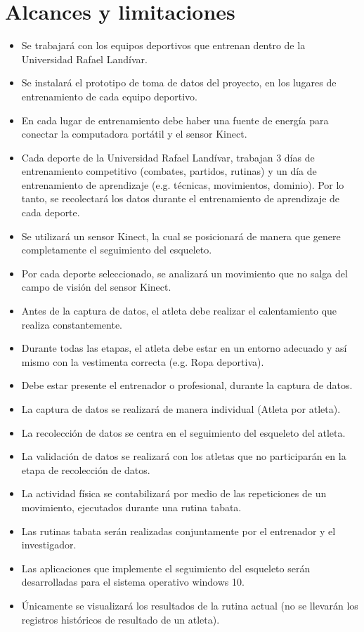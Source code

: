 \section{Alcances y limitaciones}
\begin{itemize}
\item Se trabajar\'a con los equipos deportivos que entrenan dentro de la Universidad Rafael Land\'ivar.
\item Se instalar\'a el prototipo de toma de datos del proyecto, en los lugares de entrenamiento de cada equipo deportivo.
\item En cada lugar de entrenamiento debe haber una fuente de energ\'ia para conectar la computadora port\'atil y el sensor Kinect.
\item Cada deporte de la Universidad Rafael Land\'ivar, trabajan  3 d\'ias de entrenamiento competitivo (combates, partidos, rutinas) y un d\'ia de entrenamiento de aprendizaje (e.g. t\'ecnicas, movimientos, dominio). Por lo tanto, se recolectar\'a los datos durante el entrenamiento de aprendizaje de cada deporte.
\item Se utilizar\'a un sensor Kinect, la cual se posicionar\'a de manera que genere completamente el seguimiento del esqueleto.
\item Por cada deporte seleccionado, se analizar\'a un movimiento que no salga del campo de visi\'on del sensor Kinect.
\item Antes de la captura de datos, el atleta debe realizar el calentamiento que realiza constantemente.
\item Durante todas las etapas, el atleta debe estar en un entorno adecuado y as\'i mismo con la vestimenta correcta (e.g. Ropa deportiva).
\item Debe estar presente el entrenador o profesional, durante la captura de datos.
\item  La captura de datos se realizar\'a de manera individual (Atleta por atleta).
\item  La recolecci\'on de datos se centra en el seguimiento del esqueleto del atleta.
\item La validaci\'on de datos se realizar\'a con los atletas que no participar\'an en la etapa de recolecci\'on de datos.
\item La actividad f\'isica se contabilizar\'a por medio de las repeticiones de un  movimiento, ejecutados durante una rutina tabata.
\item Las rutinas tabata ser\'an realizadas conjuntamente por el entrenador y el investigador.
\item Las aplicaciones que implemente el seguimiento del esqueleto ser\'an desarrolladas para el sistema operativo windows 10.
\item \'Unicamente se visualizar\'a los resultados de la rutina actual (no se llevar\'an los registros hist\'oricos de resultado de un atleta).
\end{itemize}